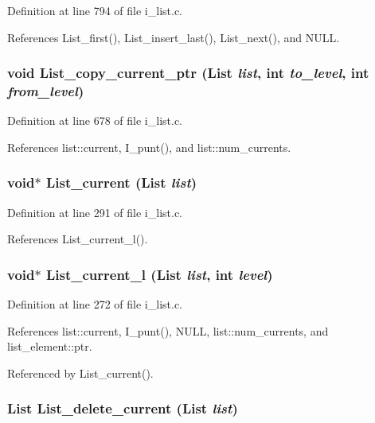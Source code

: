 Definition at line 794 of file i\_\-list.c.

References List\_\-first(), List\_\-insert\_\-last(), List\_\-next(), and NULL.
\subsubsection{\setlength{\rightskip}{0pt plus 5cm}void List\_\-copy\_\-current\_\-ptr (\bf{List} {\em list}, int {\em to\_\-level}, int {\em from\_\-level})}\label{i__list_8c_69d6726cd55b3135db23434991c97b02}




Definition at line 678 of file i\_\-list.c.

References list::current, I\_\-punt(), and list::num\_\-currents.
\subsubsection{\setlength{\rightskip}{0pt plus 5cm}void$\ast$ List\_\-current (\bf{List} {\em list})}\label{i__list_8c_6b32c12844259ec9bf14b852d0d12e75}




Definition at line 291 of file i\_\-list.c.

References List\_\-current\_\-l().
\subsubsection{\setlength{\rightskip}{0pt plus 5cm}void$\ast$ List\_\-current\_\-l (\bf{List} {\em list}, int {\em level})}\label{i__list_8c_07e4dfebd091ecc901b9a30fc7d618ed}




Definition at line 272 of file i\_\-list.c.

References list::current, I\_\-punt(), NULL, list::num\_\-currents, and list\_\-element::ptr.

Referenced by List\_\-current().
\subsubsection{\setlength{\rightskip}{0pt plus 5cm}\bf{List} List\_\-delete\_\-current (\bf{List} {\em list})}\label{i__list_8c_9247c179897f302ce524ab9ac32801f2}




